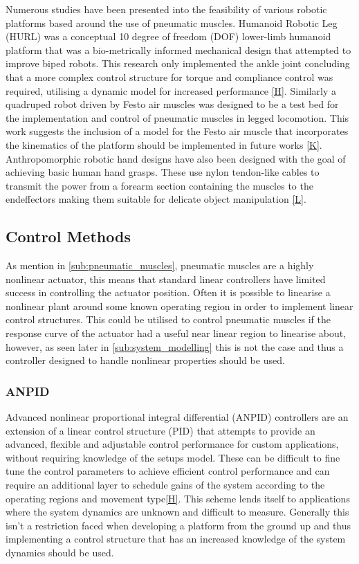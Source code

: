 \documentclass[11pt,a4paper]{article}
\begin{document}
Numerous studies have been presented into the feasibility of various robotic platforms based around the use of pneumatic muscles. Humanoid Robotic Leg (HURL) was a conceptual 10 degree of freedom (DOF) lower-limb humanoid platform that was a bio-metrically informed mechanical design that attempted to improve biped robots. This research only implemented the ankle joint concluding that a more complex control structure for torque and compliance control was required, utilising a dynamic model for increased performance \ref{H}. Similarly a quadruped robot driven by Festo air muscles was designed to be a test bed for the implementation and control of pneumatic muscles in legged locomotion. This work suggests the inclusion of a model for the Festo air muscle that incorporates the kinematics of the platform should be implemented in future works \ref{K}. Anthropomorphic robotic hand designs have also been designed with the goal of achieving basic human hand grasps. These use nylon tendon-like cables to transmit the power from a forearm section containing the muscles to the endeffectors making them suitable for delicate object manipulation \ref{L}.

\subsection{Control Methods}
\label{sub:control_methods}
As mention in \ref{sub:pneumatic_muscles}, pneumatic muscles are a highly nonlinear actuator, this means that standard linear controllers have limited success in controlling the actuator position. Often it is possible to linearise a nonlinear plant around some known operating region in order to implement linear control structures. This could be utilised to control pneumatic muscles if the response curve of the actuator had a useful near linear region to linearise about, however, as seen later in \ref{sub:system_modelling} this is not the case and thus a controller designed to handle nonlinear properties should be used. 

\subsubsection{ANPID}
\label{sub:pid}
Advanced nonlinear proportional integral differential (ANPID) controllers are an extension of a linear control structure (PID) that attempts to provide an advanced, flexible and adjustable control performance for custom applications, without requiring knowledge of the setups model. These can be difficult to fine tune the control parameters to achieve efficient control performance and can require an additional layer to schedule gains of the system according to the operating regions and movement type\ref{H}. This scheme lends itself to applications where the system dynamics are unknown and difficult to measure. Generally this isn't a restriction faced when developing a platform from the ground up and thus implementing a control structure that has an increased knowledge of the system dynamics should be used.
\end{document}
